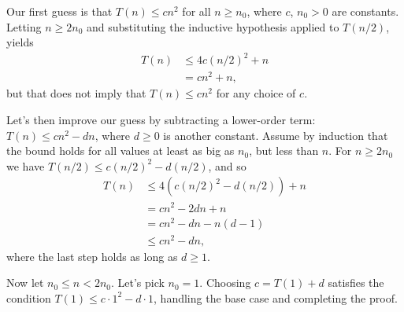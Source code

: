 Our first guess is that $T(n)\le cn^2$ for all $n\ge n_0$, where $c$, $n_0>0$ are constants.
Letting $n\ge2n_0$ and substituting the inductive hypothesis applied to $T(n/2)$, yields
\begin{align*}
    T(n) &\le 4c(n/2)^2+n \\
    &= cn^2+n,
\end{align*}
but that does not imply that $T(n)\le cn^2$ for any choice of $c$.

Let's then improve our guess by subtracting a lower-order term: $T(n)\le cn^2-dn$, where $d\ge0$ is another constant.
Assume by induction that the bound holds for all values at least as big as $n_0$, but less than $n$.
For $n\ge2n_0$ we have $T(n/2)\le c(n/2)^2-d(n/2)$, and so
\begin{align*}
    T(n) &\le 4(c(n/2)^2-d(n/2))+n \\
    &= cn^2-2dn+n \\
    &= cn^2-dn-n(d-1) \\
    &\le cn^2-dn,
\end{align*}
where the last step holds as long as $d\ge1$.

Now let $n_0\le n<2n_0$.
Let's pick $n_0=1$.
Choosing $c=T(1)+d$ satisfies the condition $T(1)\le c\cdot1^2-d\cdot1$, handling the base case and completing the proof.
